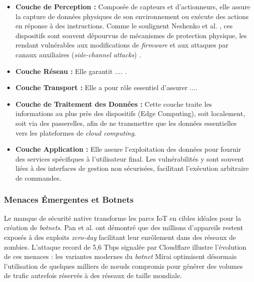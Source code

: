 \documentclass[12pt]{report}
\begin{document}
\begin{itemize}
\begin{itemize}
    \item \textbf{Couche de Perception :} Composée de capteurs et d'actionneurs, elle assure la capture de données physiques de son environnement ou exécute des actions en réponse à des instructions. Comme le soulignent Neshenko et al. \cite{neshenko2019demystifying}, ces dispositifs sont souvent dépourvus de mécanismes de protection physique, les rendant vulnérables aux modifications de \textit{firmware} \cite{basnight2013firmware} et aux attaques par canaux auxiliaires (\textit{side-channel attacks}) \cite{biryukov2017side}.
    \item \textbf{Couche Réseau :} Elle garantit .... \cite{pielli2017game}.
    \item \textbf{Couche Transport :} Elle a pour rôle essentiel d'assurer ....
    \item \textbf{Couche de Traitement des Données :} Cette couche traite les informations au plus près des dispositifs (Edge Computing), soit localement, soit via des passerelles, afin de ne transmettre que les données essentielles vers les plateformes de \textit{cloud computing}.
    \item \textbf{Couche Application :} Elle assure l'exploitation des données pour fournir des services spécifiques à l'utilisateur final. Les vulnérabilités y sont souvent liées à des interfaces de gestion non sécurisées, facilitant l'exécution arbitraire de commandes.
\end{itemize}


\subsubsection{Menaces Émergentes et Botnets}
Le manque de sécurité native transforme les parcs IoT en cibles idéales pour la création de \textit{botnets}. Pan et al. \cite{pan2025torchlight} ont démontré que des millions d'appareils restent exposés à des exploits \textit{zero-day} facilitant leur enrôlement dans des réseaux de zombies. L'attaque record de 5,6 Tbps signalée par Cloudflare \cite{cloudflare_ddos_2025} illustre l'évolution de ces menaces : les variantes modernes du \textit{botnet} Mirai optimisent désormais l'utilisation de quelques milliers de nœuds compromis pour générer des volumes de trafic autrefois réservés à des réseaux de taille mondiale.



\end{itemize}
\end{document}
